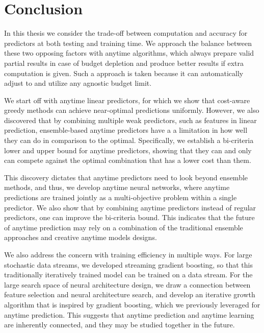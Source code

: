 \section{Conclusion}

In this thesis we consider the trade-off between computation and accuracy for predictors at 
both testing and training time. 
We approach the balance between these two opposing factors with anytime algorithms, which 
always prepare valid partial results in case of budget depletion and 
produce better results if extra computation is given. Such a approach is taken because it
can automatically adjust to and utilize any agnostic budget limit. 

We start off with anytime linear predictors, for which we show that cost-aware greedy methods
can achieve near-optimal predictions uniformly. However, we also discovered that by combining 
multiple weak predictors, such as features in linear prediction, ensemble-based anytime predictors
have a a limitation in how well they can do in comparison to the optimal. Specifically, we establish
a bi-criteria lower and upper bound for anytime predictors, showing that they can and only can compete
against the optimal combination that has a lower cost than them.

This discovery dictates that anytime predictors need to look beyond ensemble methods, and thus,
we develop anytime neural networks, where anytime predictions are trained jointly as a multi-objective
problem within a single predictor. 
We also show that by combining anytime predictors instead of regular predictors, one can 
improve the bi-criteria bound. This indicates that the future of anytime prediction may
rely on a combination of the traditional ensemble approaches and creative anytime models designs.


We also address the concern with training efficiency in multiple ways. For large stochastic data streams,
we developed streaming gradient boosting, so that this traditionally iteratively trained model
can be trained on a data stream. For the large search space of neural architecture design, we 
draw a connection between feature selection and neural architecture search, and develop an iterative
growth algorithm that is inspired by gradient boosting, which we previously leveraged for anytime prediction. 
This suggests that anytime prediction and anytime learning are inherently connected, and they may be 
studied together in the future. 


